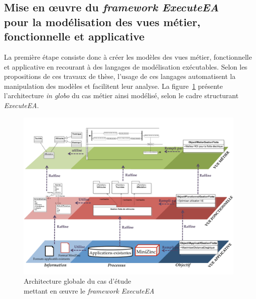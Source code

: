    \subsection{Mise en œuvre du \emph{framework ExecuteEA}\\
    pour la modélisation des vues métier, fonctionnelle et applicative}

    La première étape consiste donc à créer les modèles des vues métier, fonctionnelle
    et applicative en recourant à des langages de modélisation exécutables. Selon les
    propositions de ces travaux de thèse, l'usage de ces langages automatisent
    la manipulation des modèles et facilitent leur analyse. La
    figure~\ref{fig:architecture_generale_usecase} présente l'architecture \emph{in globo}
    du cas métier ainsi modélisé, selon le cadre structurant \emph{ExecuteEA}.








\begin{figure}[!htbp]
 \begin{center}
  \includegraphics[angle=90, width=1\textwidth]{figures/5_implementation/architecture_generale_usecase.pdf}
 \end{center}
 \caption{Architecture globale du cas d'étude \\mettant en œuvre le \protect\emph{framework ExecuteEA}}
 \label{fig:architecture_generale_usecase}
\end{figure}


